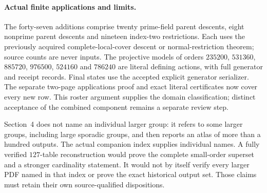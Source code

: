 \documentclass[11pt]{article}
\begin{document}
\paragraph{Actual finite applications and limits.}
The forty-seven additions comprise twenty prime-field parent descents,
eight nonprime parent descents and nineteen index-two restrictions.
Each uses the previously acquired complete-local-cover descent or
normal-restriction theorem; source counts are never inputs. The projective
models of orders $235200$, $531360$, $885720$, $976500$, $524160$ and $786240$ are literal
defining actions, with full generator and receipt records. Final states
use the accepted explicit generator serializer. The separate two-page applications proof and exact literal certificates
now cover every new row. This roster argument supplies the domain
classification; distinct acceptance of the combined component remains
a separate review step.

Section~4 does not name an individual larger group: it refers to some
larger groups, including large sporadic groups, and then reports an atlas
of more than a hundred outputs. The actual companion index supplies
individual names. A fully verified $127$-table reconstruction would prove
the complete small-order superset and a stronger cardinality statement.
It would not by itself verify every larger PDF named in that index or
prove the exact historical output set. Those claims must retain their
own source-qualified dispositions.
\end{document}

